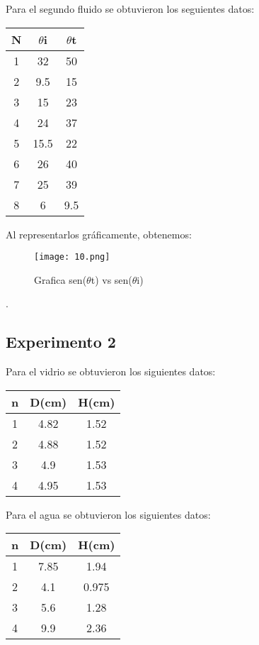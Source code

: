 \documentclass[10pt,journal]{IEEEtran}
\begin{document}
Para el segundo fluido se obtuvieron los seguientes datos:

\begin{center}
\begin{tabular}{|c|c|c|}
\hline
N & $\theta$i & $\theta$t \\
\hline
1 & 32 & 50\\
\hline
2 & 9.5 & 15\\
\hline
3 & 15 & 23\\
\hline
4 & 24 & 37\\
\hline
5 & 15.5 & 22\\
\hline
6 & 26 & 40\\
\hline
7 & 25 & 39\\
\hline
8 & 6 & 9.5\\
\hline
\end{tabular}
\end{center}


Al representarlos gráficamente, obtenemos:


\begin{figure}[!ht]
\begin {center}
\texttt{[image: 10.png]}
\caption{Grafica sen($\theta$t) vs sen($\theta$i)}
\end {center}
\end{figure}

.

\subsection{Experimento 2}

Para el vidrio se obtuvieron los siguientes datos: 

\begin{center}
\begin{tabular}{|c|c|c|}
\hline
n &  D(cm) & H(cm)  \\
\hline
1 & 4.82 & 1.52\\
\hline
2 & 4.88 & 1.52\\
\hline
3 & 4.9 & 1.53\\
\hline
4 & 4.95 & 1.53\\
\hline
\end{tabular}
\end{center}

Para el agua se obtuvieron los siguientes datos: 

\begin{center}
\begin{tabular}{|c|c|c|}
\hline
n &  D(cm) & H(cm)  \\
\hline
1 & 7.85 & 1.94\\
\hline
2 & 4.1 & 0.975\\
\hline
3 & 5.6 & 1.28\\
\hline
4 & 9.9 & 2.36\\
\hline
\end{tabular}
\end{center}
\end{document}
